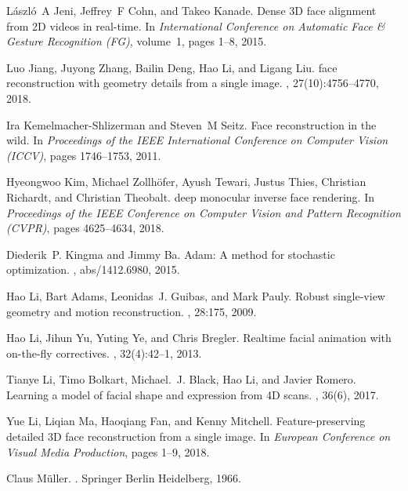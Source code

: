 \documentclass[final]{cvpr}
\begin{document}
{\begin{thebibliography}{10}
L{\'a}szl{\'o}~A Jeni, Jeffrey~F Cohn, and Takeo Kanade.
\newblock Dense {3D} face alignment from {2D} videos in real-time.
\newblock In {\em International Conference on Automatic Face \& Gesture
  Recognition (FG)}, volume~1, pages 1--8, 2015.

Luo Jiang, Juyong Zhang, Bailin Deng, Hao Li, and Ligang Liu.
 face reconstruction with geometry details from a single image.
, 27(10):4756--4770, 2018.

Ira Kemelmacher-Shlizerman and Steven~M Seitz.
\newblock Face reconstruction in the wild.
\newblock In {\em Proceedings of the IEEE International Conference on Computer
  Vision (ICCV)}, pages 1746--1753, 2011.

Hyeongwoo Kim, Michael Zollh{\"o}fer, Ayush Tewari, Justus Thies, Christian
  Richardt, and Christian Theobalt.
 deep monocular inverse face rendering.
\newblock In {\em Proceedings of the IEEE Conference on Computer Vision and
  Pattern Recognition (CVPR)}, pages 4625--4634, 2018.

Diederik~P. Kingma and Jimmy Ba.
\newblock Adam: A method for stochastic optimization.
, abs/1412.6980, 2015.

Hao Li, Bart Adams, Leonidas~J. Guibas, and Mark Pauly.
\newblock Robust single-view geometry and motion reconstruction.
, 28:175, 2009.

Hao Li, Jihun Yu, Yuting Ye, and Chris Bregler.
\newblock Realtime facial animation with on-the-fly correctives.
, 32(4):42--1, 2013.

Tianye Li, Timo Bolkart, Michael.~J. Black, Hao Li, and Javier Romero.
\newblock Learning a model of facial shape and expression from {4D} scans.
, 36(6),
  2017.

Yue Li, Liqian Ma, Haoqiang Fan, and Kenny Mitchell.
\newblock Feature-preserving detailed {3D} face reconstruction from a single
  image.
\newblock In {\em European Conference on Visual Media Production}, pages 1--9,
  2018.

Claus Müller.
.
\newblock Springer Berlin Heidelberg, 1966.


\end{thebibliography}}
\end{document}
